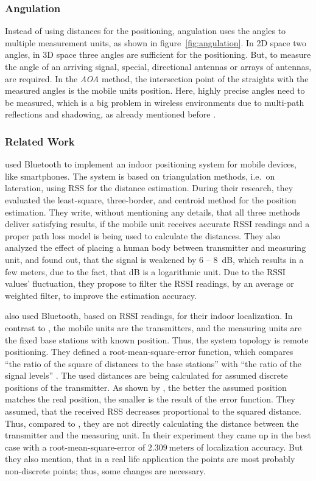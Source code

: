 \subsubsection*{Angulation}
Instead of using distances for the positioning, angulation uses the angles to multiple measurement units, as shown in figure~\ref{fig:angulation}. In 2D space two angles, in 3D space three angles are sufficient for the positioning. But, to measure the angle of an arriving signal, special, directional antennas or arrays of antennas, are required. In the \emph{\ac{AOA}} method, the intersection point of the straights with the measured angles is the mobile units position. Here, highly precise angles need to be measured, which is a big problem in wireless environments due to multi-path reflections and shadowing, as already mentioned before \citep{IEEE:survey_wireless_indoor_pos, wang:bt_pos}.

\subsubsection*{Related Work}
\citet{wang:bt_pos} used Bluetooth to implement an indoor positioning system for mobile devices, like smartphones. The system is based on triangulation methods, i.e.\ on lateration, using \acs{RSS} for the distance estimation. During their research, they evaluated the least-square, three-border, and centroid method for the position estimation. They write, without mentioning any details, that all three methods deliver satisfying results, if the mobile unit receives accurate \acs{RSSI} readings and a proper path loss model is being used to calculate the distances. They also analyzed the effect of placing a human body between transmitter and measuring unit, and found out, that the signal is weakened by 6 -- 8~dB, which results in a few meters, due to the fact, that dB is a logarithmic unit. Due to the \ac{RSSI} values' fluctuation, they propose to filter the \acs{RSSI} readings, by an average or weighted filter, to improve the estimation accuracy.

\citet{oksar:bluetooth} also used Bluetooth, based on \acs{RSSI} readings, for their indoor localization. In contrast to \citet{wang:bt_pos}, the mobile units are the transmitters, and the measuring units are the fixed base stations with known position. Thus, the system topology is remote positioning. They defined a root-mean-square-error function, which compares ``the ratio of the square of distances to the base stations'' with ``the ratio of the signal levels'' \citep{oksar:bluetooth}. The used distances are being calculated for assumed discrete positions of the transmitter. As shown by \citet{oksar:bluetooth}, the better the assumed position matches the real position, the smaller is the result of the error function. They assumed, that the received \acs{RSS} decreases proportional to the squared distance. Thus, compared to \citet{wang:bt_pos}, they are not directly calculating the distance between the transmitter and the measuring unit. In their experiment they came up in the best case with a root-mean-square-error of $2.309~\text{meters}$ of localization accuracy. But they also mention, that in a real life application the points are most probably non-discrete points; thus, some changes are necessary.


